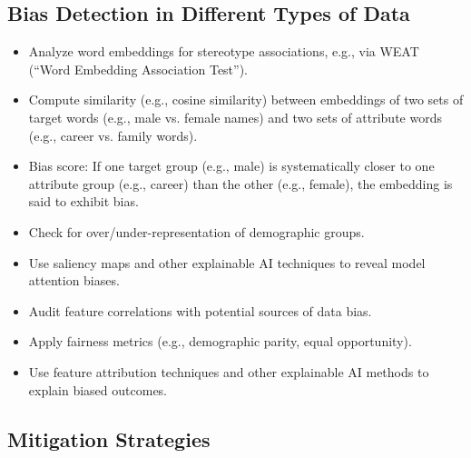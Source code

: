 \documentclass{article}
\begin{document}
\subsection*{Bias Detection in Different Types of Data}
\begin{itemize}
    \item Analyze word embeddings for stereotype associations, e.g., via WEAT (“Word Embedding Association Test”).
    \item Compute similarity (e.g., cosine similarity) between embeddings of two sets of target words (e.g., male vs. female names) and two sets of attribute words (e.g., career vs. family words).
    \item Bias score: If one target group (e.g., male) is systematically closer to one attribute group (e.g., career) than the other (e.g., female), the embedding is said to exhibit bias.
\end{itemize}

\begin{itemize}
    \item Check for over/under-representation of demographic groups.
    \item Use saliency maps and other explainable AI techniques to reveal model attention biases.
\end{itemize}

\begin{itemize}
    \item Audit feature correlations with potential sources of data bias.
    \item Apply fairness metrics (e.g., demographic parity, equal opportunity).
    \item Use feature attribution techniques and other explainable AI methods to explain biased outcomes.
\end{itemize}

\subsection*{Mitigation Strategies}
\end{document}
